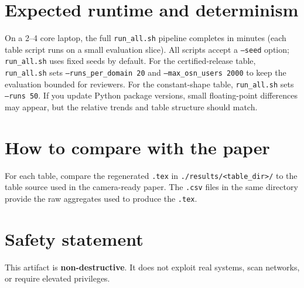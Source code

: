 \documentclass[letterpaper,twocolumn,10pt]{article}
\begin{document}
\section{Expected runtime and determinism}
On a 2--4 core laptop, the full \texttt{run\_all.sh} pipeline completes in minutes (each table script runs on a small evaluation slice).
All scripts accept a \texttt{--seed} option; \texttt{run\_all.sh} uses fixed seeds by default. For the certified-release table, \texttt{run\_all.sh} sets \texttt{--runs\_per\_domain 20} and \texttt{--max\_osn\_users 2000} to keep the evaluation bounded for reviewers. For the constant-shape table, \texttt{run\_all.sh} sets \texttt{--runs 50}.
If you update Python package versions, small floating-point differences may appear, but the relative trends and table structure should match.

\section{How to compare with the paper}
For each table, compare the regenerated \texttt{.tex} in \texttt{./results/<table\_dir>/} to the table source used in the camera-ready paper.
The \texttt{.csv} files in the same directory provide the raw aggregates used to produce the \texttt{.tex}.

\section{Safety statement}
This artifact is \textbf{non-destructive}. It does not exploit real systems, scan networks, or require elevated privileges.
\end{document}
